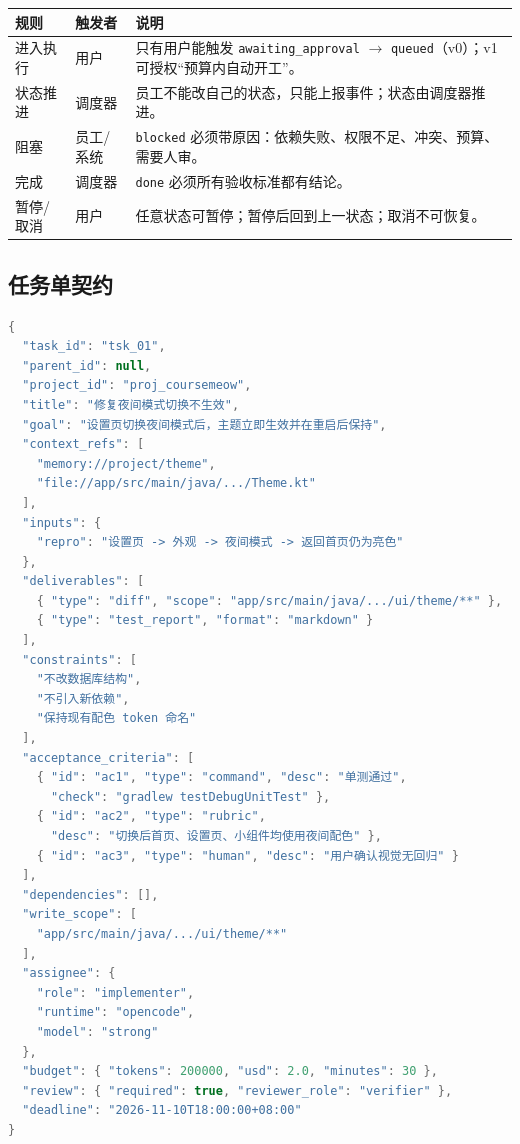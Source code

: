 \documentclass[UTF8,11pt,a4paper,fontset=windows]{ctexart}
\let\ocsubsection\subsection
\renewcommand{\subsection}{\Needspace{5\baselineskip}\ocsubsection}
\newcommand{\code}[1]{\texttt{#1}}
\begin{document}
\noindent\begin{minipage}{\linewidth}
\centering
{}
\small
\begin{tabularx}{\linewidth}{@{}p{3.2cm} p{2.8cm} X@{}}
\toprule
\textbf{规则} & \textbf{触发者} & \textbf{说明} \\
\midrule
进入执行 & 用户 & 只有用户能触发 \code{awaiting\_approval} $\rightarrow$ \code{queued}（v0）；v1 可授权“预算内自动开工”。 \\
状态推进 & 调度器 & 员工不能改自己的状态，只能上报事件；状态由调度器推进。 \\
阻塞 & 员工/系统 & \code{blocked} 必须带原因：依赖失败、权限不足、冲突、预算、需要人审。 \\
完成 & 调度器 & \code{done} 必须所有验收标准都有结论。 \\
暂停/取消 & 用户 & 任意状态可暂停；暂停后回到上一状态；取消不可恢复。 \\
\bottomrule
\end{tabularx}
\end{minipage}

\subsection{任务单契约}

\begin{lstlisting}[language=Java,caption={任务单 JSON 示例},label={lst:task-contract}]
{
  "task_id": "tsk_01",
  "parent_id": null,
  "project_id": "proj_coursemeow",
  "title": "修复夜间模式切换不生效",
  "goal": "设置页切换夜间模式后，主题立即生效并在重启后保持",
  "context_refs": [
    "memory://project/theme",
    "file://app/src/main/java/.../Theme.kt"
  ],
  "inputs": {
    "repro": "设置页 -> 外观 -> 夜间模式 -> 返回首页仍为亮色"
  },
  "deliverables": [
    { "type": "diff", "scope": "app/src/main/java/.../ui/theme/**" },
    { "type": "test_report", "format": "markdown" }
  ],
  "constraints": [
    "不改数据库结构",
    "不引入新依赖",
    "保持现有配色 token 命名"
  ],
  "acceptance_criteria": [
    { "id": "ac1", "type": "command", "desc": "单测通过",
      "check": "gradlew testDebugUnitTest" },
    { "id": "ac2", "type": "rubric",
      "desc": "切换后首页、设置页、小组件均使用夜间配色" },
    { "id": "ac3", "type": "human", "desc": "用户确认视觉无回归" }
  ],
  "dependencies": [],
  "write_scope": [
    "app/src/main/java/.../ui/theme/**"
  ],
  "assignee": {
    "role": "implementer",
    "runtime": "opencode",
    "model": "strong"
  },
  "budget": { "tokens": 200000, "usd": 2.0, "minutes": 30 },
  "review": { "required": true, "reviewer_role": "verifier" },
  "deadline": "2026-11-10T18:00:00+08:00"
}
\end{lstlisting}
\end{document}
